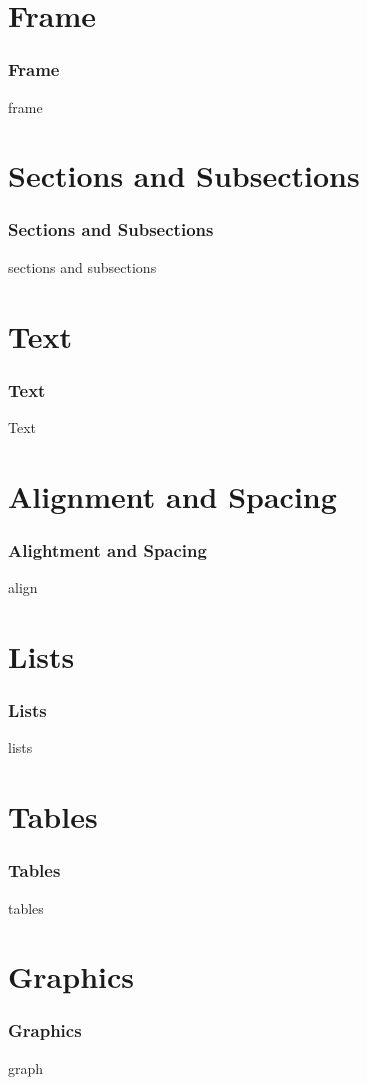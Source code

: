 \documentclass[aspectratio=169,utf8]{ctexbeamer}
\begin{document}
\section*{Frame}
\begin{frame}
  \frametitle{Frame}

  frame
\end{frame}

\section*{Sections and Subsections}
\begin{frame}
  \frametitle{Sections and Subsections}

  sections and subsections
\end{frame}

\section*{Text}
\begin{frame}
  \frametitle{Text}
  Text
\end{frame}

\section*{Alignment and Spacing}
\begin{frame}
  \frametitle{Alightment and Spacing}
  align
\end{frame}

\section*{Lists}
\begin{frame}
  \frametitle{Lists}
  lists
\end{frame}

\section*{Tables}
\begin{frame}
  \frametitle{Tables}
  tables
\end{frame}

\section*{Graphics}
\begin{frame}
  \frametitle{Graphics}
  graph
\end{frame}
\end{document}
